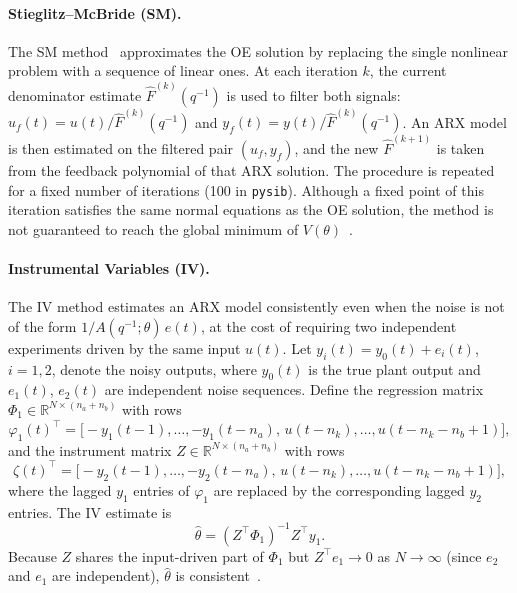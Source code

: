 \documentclass{ifacconf}
\begin{document}
\paragraph*{Stieglitz--McBride (SM).}
The SM method~\cite{stieglitz1965} approximates the OE solution by replacing the single nonlinear
problem with a sequence of linear ones.  At each iteration $k$, the current
denominator estimate $\hat{F}^{(k)}(q^{-1})$ is used to filter both signals:
$u_f(t) = u(t)/\hat{F}^{(k)}(q^{-1})$ and
$y_f(t) = y(t)/\hat{F}^{(k)}(q^{-1})$.
An ARX model is then estimated on the filtered pair $(u_f, y_f)$,
and the new $\hat{F}^{(k+1)}$ is taken from the feedback polynomial of that
ARX solution.  The procedure is repeated for a fixed number of iterations
(100 in \texttt{pysib}).  Although a fixed point of this iteration satisfies
the same normal equations as the OE solution, the method is not guaranteed to
reach the global minimum of $V(\theta)$~\cite{ljung1999}.

\paragraph*{Instrumental Variables (IV).}
The IV method estimates an ARX model consistently even when the noise
is not of the form $1/A(q^{-1};\theta)\,e(t)$, at the cost of requiring two
independent experiments driven by the same input $u(t)$.  Let
$y_i(t) = y_0(t) + e_i(t)$, $i = 1,2$, denote the noisy outputs, where
$y_0(t)$ is the true plant output and $e_1(t)$, $e_2(t)$ are independent
noise sequences.  Define the regression matrix
$\Phi_1 \in \mathbb{R}^{N \times (n_a+n_b)}$ with rows
\[
  \varphi_1(t)^\top = \bigl[-y_1(t-1),\ldots,-y_1(t-n_a),\,
                             u(t-n_k),\ldots,u(t-n_k-n_b+1)\bigr],
\]
and the instrument matrix $Z \in \mathbb{R}^{N \times (n_a+n_b)}$ with rows
\[
  \zeta(t)^\top = \bigl[-y_2(t-1),\ldots,-y_2(t-n_a),\,
                          u(t-n_k),\ldots,u(t-n_k-n_b+1)\bigr],
\]
where the lagged $y_1$ entries of $\varphi_1$ are replaced by the
corresponding lagged $y_2$ entries.  The IV estimate is
\begin{equation}
    \hat{\theta} = (Z^\top \Phi_1)^{-1} Z^\top y_1.
    \label{eq:iv}
\end{equation}
Because $Z$ shares the input-driven part of $\Phi_1$ but $Z^\top e_1 \to 0$
as $N \to \infty$ (since $e_2$ and $e_1$ are independent),
$\hat{\theta}$ is consistent~\cite{soderstrom1989}.
\end{document}
